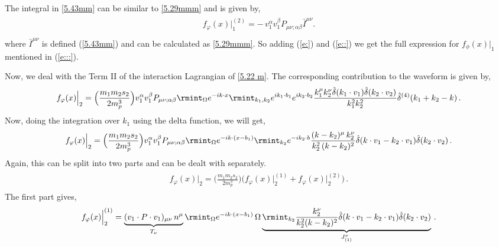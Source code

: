 The integral in \eqref{5.43mm} can be similar to \eqref{5.29mmm} and is given by,
\begin{align}
    \begin{split} \label{e::}
f_{\varphi}(x)\Big|_{1}^{(2)}=-\,v_1^{\alpha}v_1^\beta P_{\mu\nu;\alpha\beta} \bar I^{\mu\nu}.\\
    \end{split}
\end{align}
where $\bar I^{\mu\nu}$ is defined (\ref{5.43mm}) and can be calculated as \eqref{5.29mmm}. So adding (\ref{e:}) and  (\ref{e::}) we get the full expression for $f_{\phi}(x)\Big|_1$ mentioned in (\ref{e:::}).

Now, we deal with the Term II of the interaction Lagrangian of \eqref{5.22 m}. The corresponding contribution to the waveform is given by,
\begin{align}
    \begin{split} \label{ex6}
        f_{\varphi}(x)\Big|_{2}=\Big(\frac{m_1 m_2 s_2}{2m_p^3}\Big)v_1^\alpha v_1^\beta P_{\mu\nu;\alpha\beta}\rmint_{\Omega} e^{-ik\cdot x}\rmint_{k_1,k_2}e^{ik_1\cdot b_1}e^{ik_2\cdot b_2}\frac{k_1^\mu k_2^\nu\hat\delta(k_1\cdot v_1)\hat\delta(k_2\cdot v_2)}{k_1^2 k_2^2}\hat\delta^{(4)}(k_1+k_2-k)\,.
    \end{split}
\end{align}
Now, doing the integration over $k_1$ using the delta function, we will get,
\begin{align}
    \begin{split}
         f_{\varphi}(x)\Big|_{2}=\Big(\frac{m_1 m_2 s_2}{2m_p^3}\Big)v_1^\alpha v_1^\beta P_{\mu\nu;\alpha\beta}\rmint_{\Omega}e^{-ik\cdot (x-b_1)}\rmint_{k_2}e^{-i k_2 \cdot b}\frac{(k-k_2)^\mu \,k_2^\nu}{k_2^2\,(k-k_2)^2}\hat\delta(k\cdot v_1-k_2\cdot v_1)\hat\delta(k_2\cdot v_2)\,.\label{5.46 m}
    \end{split}
\end{align}
Again, this can be split into two parts and can be dealt with separately. 
\begin{align}
    \begin{split} \label{ex3}
    f_{\varphi}(x)\Big|_{2}=\Big(\frac{m_1 m_2 s_2}{2m_p^3}\Big)\Big(f_{\varphi}(x)\Big|^{(1)}_{2}+f_{\varphi}(x)\Big|^{(2)}_{2}\Big)\,.
     \end{split}
\end{align}
The first part gives,
\begin{align}
    \begin{split}
        f_{\varphi}(x)\Big|_{2}^{(1)}=\underbrace{(v_1\cdot P\cdot v_1)_{\mu\nu}\,n^{\mu}}_{T_{\nu}}\rmint_{\Omega}e^{-ik\cdot (x-b_1)}\,\Omega\underbrace{\rmint_{k_2}\frac{k_2^\nu}{k_2^2(k-k_2)^2}\hat\delta(k\cdot v_1-k_2\cdot v_1)\hat\delta(k_2\cdot v_2)}_{J_{(1)}^\nu}\,.\label{5.57 m}
    \end{split}
\end{align}
